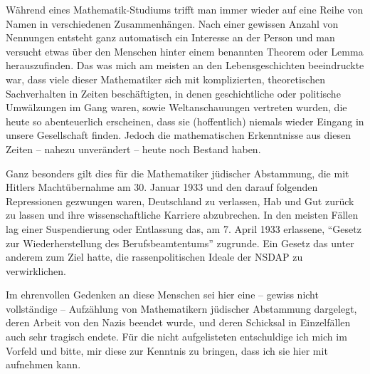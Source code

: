Während eines Mathematik-Studiums trifft man immer wieder auf eine Reihe von Namen in verschiedenen Zusammenhängen. Nach einer gewissen Anzahl von Nennungen entsteht ganz automatisch ein Interesse an der Person und man versucht etwas über den Menschen hinter einem benannten Theorem oder Lemma herauszufinden. Das was mich am meisten an den Lebensgeschichten beeindruckte war, dass viele dieser Mathematiker sich mit komplizierten, theoretischen Sachverhalten in Zeiten beschäftigten, in denen geschichtliche oder politische Umwälzungen im Gang waren, sowie Weltanschauungen vertreten wurden, die heute so abenteuerlich erscheinen, dass sie (hoffentlich) niemals wieder Eingang in unsere Gesellschaft finden. Jedoch die mathematischen Erkenntnisse aus diesen Zeiten -- nahezu unverändert -- heute noch Bestand haben. 

Ganz besonders gilt dies für die Mathematiker jüdischer Abstammung, die mit Hitlers Machtübernahme am 30. Januar 1933 und den darauf folgenden Repressionen gezwungen waren, Deutschland zu verlassen, Hab und Gut zurück zu lassen und ihre wissenschaftliche Karriere abzubrechen. In den meisten Fällen lag einer Suspendierung oder Entlassung das, am 7. April 1933 erlassene, "`Gesetz zur Wiederherstellung des Berufsbeamtentums"' zugrunde. Ein Gesetz das unter anderem zum Ziel hatte, die rassenpolitischen Ideale der NSDAP zu verwirklichen. 

Im ehrenvollen Gedenken an diese Menschen sei hier eine -- gewiss nicht vollständige -- Aufzählung von Mathematikern jüdischer Abstammung dargelegt, deren Arbeit von den Nazis beendet wurde, und deren Schicksal in Einzelfällen auch sehr tragisch endete. Für die nicht aufgelisteten entschuldige ich mich im Vorfeld und bitte, mir diese zur Kenntnis zu bringen, dass ich sie hier mit aufnehmen kann.


